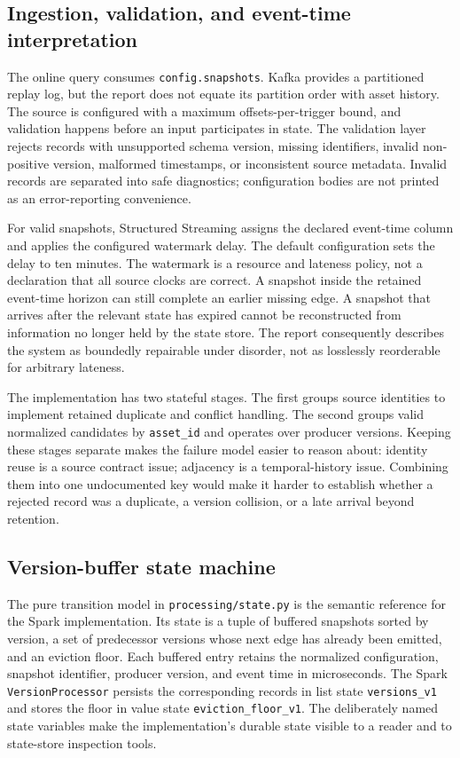 \subsection{Ingestion, validation, and event-time interpretation}

The online query consumes \texttt{config.snapshots}. Kafka provides a partitioned replay log, but the report does not equate its partition order with asset history. The source is configured with a maximum offsets-per-trigger bound, and validation happens before an input participates in state. The validation layer rejects records with unsupported schema version, missing identifiers, invalid non-positive version, malformed timestamps, or inconsistent source metadata. Invalid records are separated into safe diagnostics; configuration bodies are not printed as an error-reporting convenience.

For valid snapshots, Structured Streaming assigns the declared event-time column and applies the configured watermark delay. The default configuration sets the delay to ten minutes. The watermark is a resource and lateness policy, not a declaration that all source clocks are correct. A snapshot inside the retained event-time horizon can still complete an earlier missing edge. A snapshot that arrives after the relevant state has expired cannot be reconstructed from information no longer held by the state store. The report consequently describes the system as boundedly repairable under disorder, not as losslessly reorderable for arbitrary lateness.

The implementation has two stateful stages. The first groups source identities to implement retained duplicate and conflict handling. The second groups valid normalized candidates by \texttt{asset\_id} and operates over producer versions. Keeping these stages separate makes the failure model easier to reason about: identity reuse is a source contract issue; adjacency is a temporal-history issue. Combining them into one undocumented key would make it harder to establish whether a rejected record was a duplicate, a version collision, or a late arrival beyond retention.

\subsection{Version-buffer state machine}

The pure transition model in \texttt{processing/state.py} is the semantic reference for the Spark implementation. Its state is a tuple of buffered snapshots sorted by version, a set of predecessor versions whose next edge has already been emitted, and an eviction floor. Each buffered entry retains the normalized configuration, snapshot identifier, producer version, and event time in microseconds. The Spark \texttt{VersionProcessor} persists the corresponding records in list state \texttt{versions\_v1} and stores the floor in value state \texttt{eviction\_floor\_v1}. The deliberately named state variables make the implementation's durable state visible to a reader and to state-store inspection tools.

